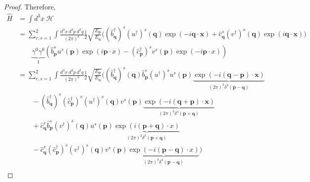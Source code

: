 \begin{proof}
        Therefore, 
        \begin{equation*}
        \begin{aligned}
            \hat H & = \int d^3 x ~ \mathcal H \\ & = \sum_{r, s=1}^{2} \int \frac{d^3 x ~ d^3 p ~ d^3 q}{(2\pi)^6} \frac{1}{2} \sqrt{\frac{E_{\mathbf p}}{E_{\mathbf q}}} \Big ( (\hat b^\dagger_{\mathbf q})^s (u^\dagger)^s (\mathbf q) \exp(- i \mathbf q \cdot \mathbf x) + \hat c^s_{\mathbf q} (v^\dagger)^s (\mathbf q) \exp(i \mathbf q \cdot \mathbf x) \Big) \\ & \qquad \underbrace{\gamma^0 \gamma^0}_1 (\hat b^s_{\mathbf p} u^s (\mathbf p) \exp(i \mathbf p \cdot x) - (\hat c^\dagger_{\mathbf p})^s v^s (\mathbf p) \exp(-i \mathbf p \cdot x) ) \\ & = \sum_{r, s=1}^{2} \int \frac{d^3 x ~ d^3 p ~ d^3 q}{(2\pi)^6} \frac{1}{2} \sqrt{\frac{E_{\mathbf p}}{E_{\mathbf q}}} \Big ( (\hat b^\dagger_{\mathbf q})^s (\mathbf q) \hat b^s_{\mathbf p} (u^\dagger)^s u^s (\mathbf p) \underbrace{\exp(- i (\mathbf q - \mathbf p )\cdot \mathbf x)}_{(2\pi)^3 \delta^3 (\mathbf p - \mathbf q)} \\ & \qquad - (\hat b^\dagger_{\mathbf q})^s (\hat c^\dagger_{\mathbf p})^s (u^\dagger)^s (\mathbf q) v^s (\mathbf p) \underbrace{\exp(- i (\mathbf q + \mathbf p) \cdot \mathbf x) }_{(2\pi)^3 \delta^3 (\mathbf p + \mathbf q)} \\ & \qquad + \hat c^s_{\mathbf q} \hat b^s_{\mathbf p} (v^\dagger)^s (\mathbf q) u^s (\mathbf p) \underbrace{\exp(i (\mathbf p + \mathbf q) \cdot x)}_{(2\pi)^3 \delta^3 (\mathbf p + \mathbf q)}  \\ & \qquad - \hat c^s_{\mathbf q} (\hat c^\dagger_{\mathbf p})^s (v^\dagger)^s (\mathbf q) v^s (\mathbf p)\underbrace{ \exp(- i (\mathbf p - \mathbf q) \cdot x) }_{(2\pi)^3 \delta^3 (\mathbf p - \mathbf q)} \Big )
        \end{aligned}
        \end{equation*}
        \begin{equation*}
        \begin{aligned}

\end{aligned}
\end{equation*}
\end{proof}
